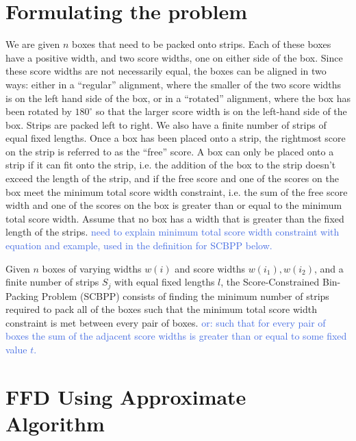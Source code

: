 \documentclass[oribibl]{llncs}
\begin{document}
\section{Formulating the problem}
We are given $n$ boxes that need to be packed onto strips. Each of these boxes have a positive width, and two score widths, one on either side of the box. Since these score widths are not necessarily equal, the boxes can be aligned in two ways: either in a ``regular'' alignment, where the smaller of the two score widths is on the left hand side of the box, or in a ``rotated'' alignment, where the box has been rotated by $180^{\circ}$ so that the larger score width is on the left-hand side of the box. Strips are packed left to right. We also have a finite number of strips of equal fixed lengths. Once a box has been placed onto a strip, the rightmost score on the strip is referred to as the ``free'' score. A box can only be placed onto a strip if it can fit onto the strip, i.e. the addition of the box to the strip doesn't exceed the length of the strip, and if the free score and one of the scores on the box meet the minimum total score width constraint, i.e. the sum of the free score width and one of the scores on the box is greater than or equal to the minimum total score width. Assume that no box has a width that is greater than the fixed length of the strips. \textcolor{RoyalBlue}{need to explain minimum total score width constraint with equation and example, used in the definition for SCBPP below.}


\begin{definition} 

	Given $n$ boxes of varying widths $w(i)$ and score widths $w(i_1), w(i_2)$, and a finite number of strips $S_j$ with equal fixed lengths $l$, the Score-Constrained Bin-Packing Problem (SCBPP) consists of finding the minimum number of strips required to pack all of the boxes such that the minimum total score width constraint is met between every pair of boxes. \textcolor{RoyalBlue}{or: such that for every pair of boxes the sum of the adjacent score widths is greater than or equal to some fixed value $t$.}
\end{definition}



\section{FFD Using Approximate Algorithm}
\end{document}
